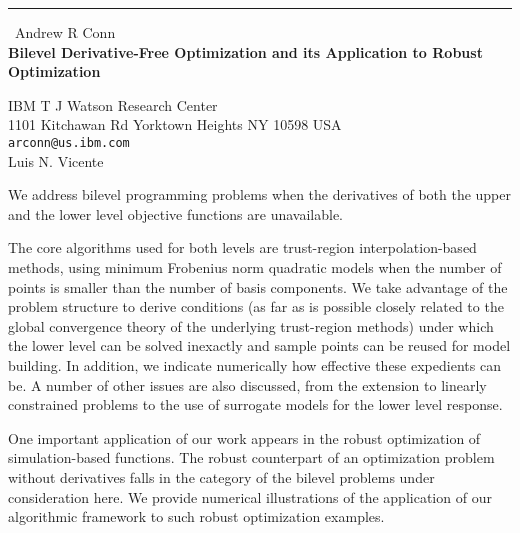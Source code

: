 \documentclass{report}
\begin{document}
\begin{center}
\rule{6in}{1pt} \
{\large Andrew R Conn \\
{\bf Bilevel Derivative-Free Optimization and its Application to Robust Optimization }}

IBM T J Watson Research Center \\ 1101 Kitchawan Rd Yorktown Heights NY 10598 USA
\\
{\tt arconn@us.ibm.com}\\
Luis N. Vicente\end{center}

We address bilevel programming problems when the derivatives of both the upper
and the lower level objective functions are unavailable.

The core algorithms used for both levels are trust-region interpolation-based
methods, using minimum Frobenius norm quadratic models when the number of
points is smaller
than the number of basis components. We take advantage of the problem structure to derive
conditions (as far as is possible closely related to the global convergence theory of the
underlying trust-region methods) under which the lower level can be solved inexactly and
sample points can be reused for model building.
In addition, we indicate numerically how effective these expedients can be.
A number of other issues are also discussed, from the extension to linearly constrained
problems to the use of surrogate models for the lower level response.

One important application of our work appears in the robust optimization
of simulation-based
functions. The robust counterpart of an optimization problem without derivatives falls
in the category of the bilevel problems under consideration here. We provide numerical
illustrations of the application of our algorithmic framework to such
robust optimization examples.
\end{document}
